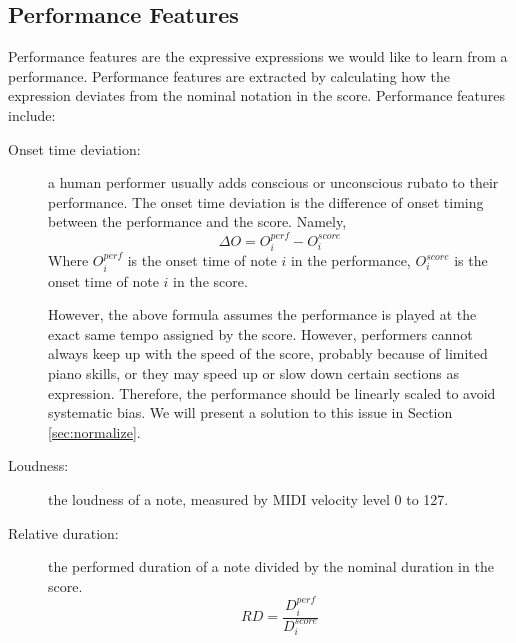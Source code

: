 


\subsection{Performance Features}
   Performance features are the expressive expressions we would like to learn from a performance. Performance features are extracted by calculating how the expression deviates from the nominal notation in the score.
      Performance features include:
      \begin{description}
         \item [Onset time deviation:] 
            a human performer usually adds conscious or unconscious rubato to their performance. The onset time deviation is the difference of onset timing between the performance and the score. Namely,
            $$ \Delta O = O_i^{perf} - O_i^{score} $$ Where $O_i^{perf}$ is the onset time of note $i$ in the performance, $O_i^{score}$ is the onset time of note $i$ in the score. 

            However, the above formula assumes the performance is played at the exact same tempo assigned by the score. However, performers cannot always keep up with the speed of the score, probably because of limited piano skills, or they may speed up or slow down certain sections as expression. Therefore, the performance should be linearly scaled to avoid systematic bias. We will present a solution to this issue in Section \ref{sec:normalize}.
         \item [Loudness:] the loudness of a note, measured by MIDI velocity level 0 to 127.

         \item [Relative duration:]
            the performed duration of a note divided by the nominal duration in the score.
            $$ RD = \frac{ D_i^{perf}}{D_i^{score}}$$
      \end{description}


